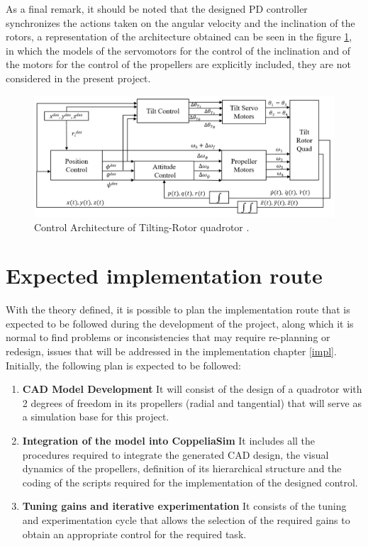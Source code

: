 \documentclass[a4paper, 12pt, oneside]{book}
\begin{document}
As a final remark, it should be noted that the designed PD controller synchronizes the actions taken on the angular velocity and the inclination of the rotors, a representation of the architecture obtained can be seen in the figure \ref{fig:control_arq}, in which the models of the servomotors for the control of the inclination and of the motors for the control of the propellers are explicitly included, they are not considered in the present project.

\begin{figure}[H]
    \begin{center}
        \includegraphics[width=.95\linewidth]{figures/control_arq.PNG}
        \caption{Control Architecture of Tilting-Rotor quadrotor \cite{kumar2017position}.}
        \label{fig:control_arq}
    \end{center}
\end{figure}

\section{Expected implementation route}
With the theory defined, it is possible to plan the implementation route that is expected to be followed during the development of the project, along which it is normal to find problems or inconsistencies that may require re-planning or redesign, issues that will be addressed in the implementation chapter \ref{impl}.\\

Initially, the following plan is expected to be followed:

\begin{enumerate}
    \item \textbf{CAD Model Development} It will consist of the design of a quadrotor with 2 degrees of freedom in its propellers (radial and tangential) that will serve as a simulation base for this project.
    
    \item \textbf{Integration of the model into CoppeliaSim} It includes all the procedures required to integrate the generated CAD design, the visual dynamics of the propellers, definition of its hierarchical structure and the coding of the scripts required for the implementation of the designed control.

    \item \textbf{Tuning gains and iterative experimentation} It consists of the tuning and experimentation cycle that allows the selection of the required gains to obtain an appropriate control for the required task.
\end{enumerate}
\end{document}
